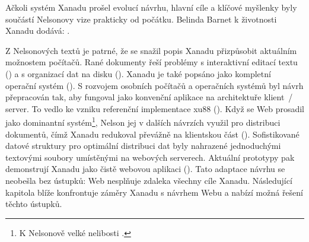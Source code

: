 Ačkoli systém Xanadu prošel evolucí návrhu, hlavní cíle a klíčové myšlenky byly součástí Nelsonovy vize prakticky od počátku. Belinda Barnet k životnosti Xanadu dodává: .

Z Nelsonových textů je patrné, že se snažil popis Xanadu přizpůsobit aktuálním možnostem počítačů. Rané dokumenty řeší problémy s interaktivní editací textu () a s organizací dat na disku (). Xanadu je také popsáno jako kompletní operační systém ().
S rozvojem osobních počítačů a operačních systémů byl návrh přepracován tak, aby fungoval jako konvenční aplikace na architektuře klient~/ server. To vedlo ke vzniku referenční implementace xu88 (). Když se Web prosadil jako dominantní systém\footnote{K Nelsonově velké nelibosti \autocite[viz][]{Nelson:buyin}.},
Nelson jej v dalších návrzích využil pro distribuci dokumentů, čímž Xanadu redukoval převážně na klientskou část (). Sofistikované datové struktury pro optimální distribuci dat byly nahrazené jednoduchými textovými soubory umístěnými na webových serverech. Aktuální prototypy pak demonstrují Xanadu jako čistě webovou aplikaci (). Tato adaptace návrhu se neobešla bez ústupků: Web nesplňuje zdaleka všechny cíle Xanadu. Následující kapitola blíže konfrontuje záměry Xanadu s návrhem Webu a nabízí možná řešení těchto ústupků.
